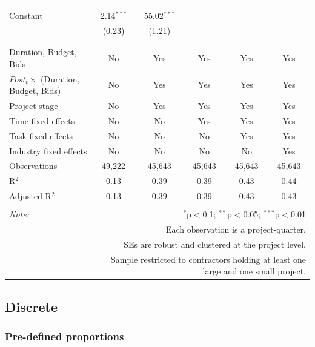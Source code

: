 \documentclass[
]{article}
\begin{document}
\begin{table}[H]
\begin{tabular}{@{\extracolsep{-2pt}}lccccc}
  & & & & & \\ 
 Constant & 2.14$^{***}$ & 55.02$^{***}$ &  &  &  \\ 
  & (0.23) & (1.21) &  &  &  \\ 
  & & & & & \\ 
\hline \\[-1.8ex] 
Duration, Budget, Bids & No & Yes & Yes & Yes & Yes \\ 
$Post_t \times $  (Duration, Budget, Bids) & No & Yes & Yes & Yes & Yes \\ 
Project stage & No & Yes & Yes & Yes & Yes \\ 
Time fixed effects & No & No & Yes & Yes & Yes \\ 
Task fixed effects & No & No & No & Yes & Yes \\ 
Industry fixed effects & No & No & No & No & Yes \\ 
Observations & 49,222 & 45,643 & 45,643 & 45,643 & 45,643 \\ 
R$^{2}$ & 0.13 & 0.39 & 0.39 & 0.43 & 0.44 \\ 
Adjusted R$^{2}$ & 0.13 & 0.39 & 0.39 & 0.43 & 0.43 \\ 
\hline 
\hline \\[-1.8ex] 
\textit{Note:}  & \multicolumn{5}{r}{$^{*}$p$<$0.1; $^{**}$p$<$0.05; $^{***}$p$<$0.01} \\ 
 & \multicolumn{5}{r}{Each observation is a project-quarter.} \\ 
 & \multicolumn{5}{r}{SEs are robust and clustered at the project level.} \\ 
 & \multicolumn{5}{r}{Sample restricted to contractors holding at least one large and one small project.} \\ 
\end{tabular} 
\end{table}

\hypertarget{discrete}{%
\subsection{Discrete}\label{discrete}}

\hypertarget{pre-defined-proportions}{%
\subsubsection{Pre-defined proportions}\label{pre-defined-proportions}}
\end{document}
